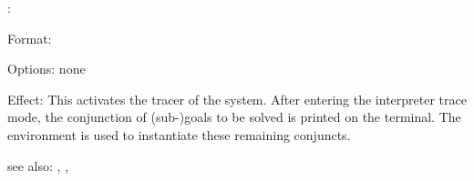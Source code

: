 \spy:

Format: 

Options: none

Effect: This activates the tracer of the \RELFUN{} system. After entering
	the interpreter trace mode, the conjunction of (sub-)goals to be solved
	is printed on the terminal. The environment is used to instantiate 
	these remaining conjuncts.

see also: \nospy, \showdepth,

